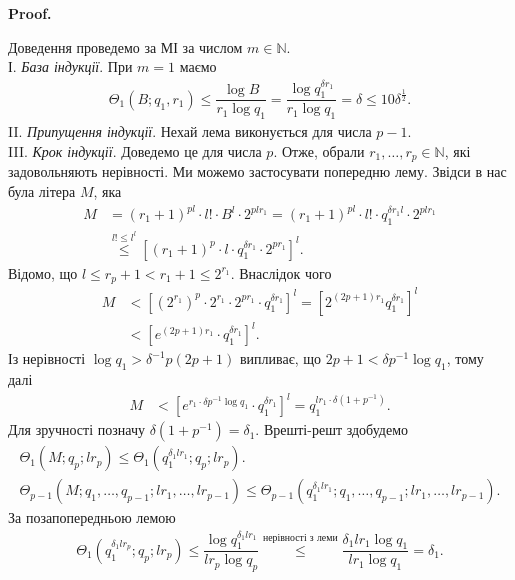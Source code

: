 \documentclass[a4paper, 10pt]{article}
\makeatletter
\theoremstyle{theoremdd}
\theoremstyle{theoremdd}
\theoremstyle{theoremdd}
\theoremstyle{theoremdd}
\theoremstyle{theoremdd}
\theoremstyle{theoremdd}
\theoremstyle{theoremdd}
\theoremstyle{theoremdd}
\theoremstyle{theoremdd}
\theoremstyle{theoremdd}
\theoremstyle{theoremdd}
\theoremstyle{theoremdd}
\theoremstyle{theoremdd}
\theoremstyle{theoremdd}
\theoremstyle{theoremdd}
\renewenvironment{proof}[1][Proof.\\]{\par
\pushQED{\hfill \qed}%
\normalfont \topsep6\p@\@plus6\p@\relax
\trivlist
\item\relax
{\bfseries
#1\@addpunct{.}}\hspace\labelsep\ignorespaces
}{%
\popQED\endtrivlist\@endpefalse
}
\makeatother
\begin{document}
\begin{proof}
Доведення проведемо за МІ за числом $m \in \mathbb{N}$.\\
І. \textit{База індукції}. При $m = 1$ маємо 
\begin{align*}
\Theta_1(B;q_1,r_1) \leq \dfrac{\log B}{r_1 \log q_1} = \dfrac{\log q_1^{\delta r_1}}{r_1 \log q_1} = \delta \leq 10 \delta^{\frac{1}{2}}.
\end{align*}
II. \textit{Припущення індукції}. Нехай лема виконується для числа $p-1$.\\
III. \textit{Крок індукції}. Доведемо це для числа $p$. Отже, обрали $r_1,\dots,r_p \in \mathbb{N}$, які задовольняють нерівності. Ми можемо застосувати попередню лему. Звідси в нас була літера $M$, яка
\begin{align*}
M & = (r_1+1)^{pl} \cdot l! \cdot B^l \cdot 2^{pl r_1} = (r_1+1)^{pl} \cdot l! \cdot q_1^{\delta r_1 l} \cdot 2^{pl r_1} \\
& \overset{l! \leq l^l}{\leq} \left[(r_1+1)^{p} \cdot l \cdot q_1^{\delta r_1} \cdot 2^{p r_1}\right]^l.
\end{align*}
Відомо, що $l \leq r_p + 1 < r_1 + 1 \leq 2^{r_1}$. Внаслідок чого
\begin{align*}
M & < \left[(2^{r_1})^{p} \cdot 2^{r_1} \cdot 2^{pr_1} \cdot q_1^{\delta r_1} \right]^l = \left[ 2^{(2p+1)r_1} q_1^{\delta r_1} \right]^l \\
& < \left[ e^{(2p+1)r_1} \cdot q_1^{\delta r_1} \right]^l.
\end{align*}
Із нерівності $\log q_1 > \delta^{-1} p (2p+1)$ випливає, що $2p+1 < \delta p^{-1} \log q_1$, тому далі
\begin{align*}
M & < \left[ e^{r_1 \cdot \delta p^{-1} \log q_1} \cdot q_1^{\delta r_1} \right]^l = q_1^{l r_1 \cdot \delta (1+p^{-1})}.
\end{align*}
Для зручності позначу $\delta (1+p^{-1}) = \delta_1$. Врешті-решт здобудемо
\begin{align*}
\Theta_1(M;q_p;lr_p) \leq \Theta_1(q_1^{\delta_1 lr_1};q_p;lr_p). \\
\Theta_{p-1}(M;q_1,\dots,q_{p-1};lr_1,\dots,lr_{p-1}) \leq \Theta_{p-1}(q_1^{\delta_1 l r_1};q_1,\dots,q_{p-1};lr_1,\dots,lr_{p-1}).
\end{align*}
За позапопередньою лемою
\begin{align*}
\Theta_1(q_1^{\delta_1 lr_p};q_p;lr_p) \leq \dfrac{\log q_1^{\delta_1 l r_1}}{l r_p \log q_p} \overset{\text{нерівності з леми}}{\leq} \dfrac{\delta_1 l r_1 \log q_1}{l r_1 \log q_1} = \delta_1.
\end{align*}

\end{proof}
\end{document}
